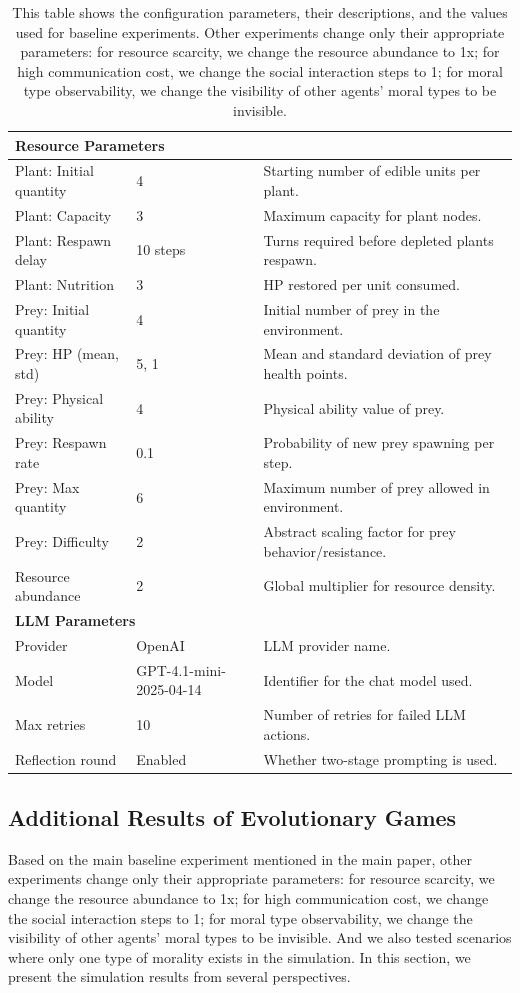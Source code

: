 \begin{table}[htbp]
\begin{tabular}{lp{1.2cm}p{6.5cm}}
\hline
\multicolumn{3}{l}{\textbf{Resource Parameters}} \\
\hline
Plant: Initial quantity & 4 & Starting number of edible units per plant. \\
Plant: Capacity & 3 & Maximum capacity for plant nodes. \\
Plant: Respawn delay & 10 steps & Turns required before depleted plants respawn. \\
Plant: Nutrition & 3 & HP restored per unit consumed. \\
Prey: Initial quantity & 4 & Initial number of prey in the environment. \\
Prey: HP (mean, std) & 5, 1 & Mean and standard deviation of prey health points. \\
Prey: Physical ability & 4 & Physical ability value of prey. \\
Prey: Respawn rate & 0.1 & Probability of new prey spawning per step. \\
Prey: Max quantity & 6 & Maximum number of prey allowed in environment. \\
Prey: Difficulty & 2 & Abstract scaling factor for prey behavior/resistance. \\
Resource abundance & 2 & Global multiplier for resource density. \\
\hline
\multicolumn{3}{l}{\textbf{LLM Parameters}} \\
\hline
Provider & OpenAI & LLM provider name. \\
Model & GPT-4.1-mini-2025-04-14 & Identifier for the chat model used. \\
Max retries & 10 & Number of retries for failed LLM actions. \\
Reflection round & Enabled & Whether two-stage prompting is used. \\
\hline
\end{tabular}
\caption{This table shows the configuration parameters, their descriptions, and the values used for baseline experiments. Other experiments change only their appropriate parameters: for resource scarcity, we change the resource abundance to 1x; for high communication cost, we change the social interaction steps to 1; for moral type observability, we change the visibility of other agents' moral types to be invisible.}
\label{tab:baseline_config}
\end{table}


\subsection{Additional Results of Evolutionary Games}
Based on the main baseline experiment mentioned in the main paper, other experiments change only their appropriate parameters: for resource scarcity, we change the resource abundance to 1x; for high communication cost, we change the social interaction steps to 1; for moral type observability, we change the visibility of other agents' moral types to be invisible. And we also tested scenarios where only one type of morality exists in the simulation.
In this section, we present the simulation results from several perspectives.

